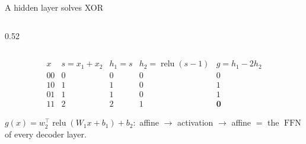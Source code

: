 \documentclass[aspectratio=169,11pt]{beamer}
\newcommand{\FFN}{\operatorname{FFN}}
\newcommand{\relu}{\operatorname{relu}}
\begin{document}
\begin{frame}[t]{A hidden layer solves XOR}
\begin{columns}[T]
\begin{column}{0.52\textwidth}
\end{column}
\end{columns}
\vspace{-0.6em}
{\small\[
\begin{array}{c|c|c|c|c}
x & s=x_1+x_2 & h_1=s & h_2=\relu(s-1) & g=h_1-2h_2\\\hline
00 & 0 & 0 & 0 & 0\\
10 & 1 & 1 & 0 & 1\\
01 & 1 & 1 & 0 & 1\\
11 & 2 & 2 & 1 & \mathbf{0}
\end{array}
\]}
\vspace{-0.4em}
\begin{bxrem}
$g(x)=w_2^\top\relu(W_1x+b_1)+b_2$:\ affine $\to$ activation $\to$ affine $=$ the $\FFN$ of every decoder layer.
\end{bxrem}
\end{frame}
\end{document}
